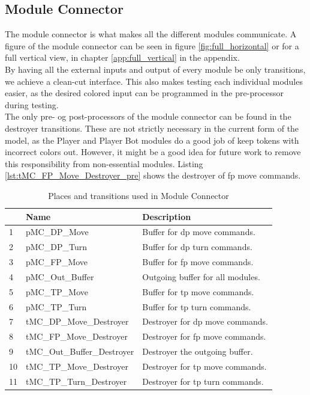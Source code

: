 \documentclass[runningheads,a4paper]{llncs}
\newcommand{\GPenSIM}{../GPenSIM}
\begin{document}
\subsection{Module Connector}
The module connector is what makes all the different modules communicate. A figure of the module connector can be seen in figure \ref{fig:full_horizontal} or for a full vertical view, in chapter \ref{app:full_vertical} in the appendix.\\

By having all the external inputs and output of every module be only transitions, we achieve a clean-cut interface. This also makes testing each individual modules easier, as the desired colored input can be programmed in the pre-processor during testing. 
\\

The only pre- og post-processors of the module connector can be found in the \ac{destroyer} transitions. These are not strictly necessary in the current form of the model, as the Player and Player Bot modules do a good job of keep tokens with incorrect colors out. However, it might be a good idea for future work to remove this responsibility from non-essential modules. Listing \ref{lst:tMC_FP_Move_Destroyer_pre} shows the destroyer of \ac{fp} move commands.

\begin{table}
	\caption{Places and transitions used in Module Connector}
	\begin{tabular}{|l|l|l|}
		\hline
		& Name & Description \\
		\hline
		1 & pMC\_DP\_Move             & Buffer for \ac{dp} move commands. \\ \hline
		2 & pMC\_DP\_Turn             & Buffer for \ac{dp} turn commands. \\ \hline
		3 & pMC\_FP\_Move             & Buffer for \ac{fp} move commands. \\ \hline
		4 & pMC\_Out\_Buffer          & Outgoing buffer for all modules. \\ \hline
		5 & pMC\_TP\_Move             & Buffer for \ac{tp} move commands. \\ \hline
		6 & pMC\_TP\_Turn             & Buffer for \ac{tp} turn commands. \\ \hline
		7 & tMC\_DP\_Move\_Destroyer     &  Destroyer for \ac{dp} move commands. \\ \hline
		8 & tMC\_FP\_Move\_Destroyer     &  Destroyer for \ac{fp} move commands.\\ \hline
		9 & tMC\_Out\_Buffer\_Destroyer  &  Destroyer the outgoing buffer.\\ \hline
		10 & tMC\_TP\_Move\_Destroyer     &  Destroyer for \ac{tp} move commands.\\ \hline
		11 & tMC\_TP\_Turn\_Destroyer     &  Destroyer for \ac{tp} turn commands.\\ \hline
	\end{tabular}
\end{table}
\clearpage
\end{document}
